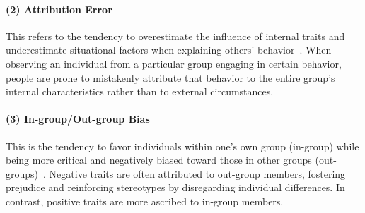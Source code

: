 \paragraph{(2) Attribution Error} This refers to the tendency to overestimate the influence of internal traits and underestimate situational factors when explaining others' behavior~\cite{pettigrew1979ultimate, harman1999moral}.
When observing an individual from a particular group engaging in certain behavior, people are prone to mistakenly attribute that behavior to the entire group’s internal characteristics rather than to external circumstances.

\paragraph{(3) In-group/Out-group Bias} This is the tendency to favor individuals within one's own group (in-group) while being more critical and negatively biased toward those in other groups (out-groups)~\cite{brewer1979group, downing1986group, struch1989intergroup}.
Negative traits are often attributed to out-group members, fostering prejudice and reinforcing stereotypes by disregarding individual differences.
In contrast, positive traits are more ascribed to in-group members.